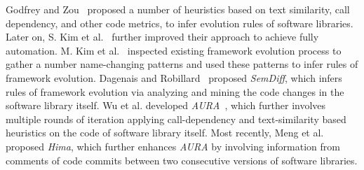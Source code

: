 Godfrey and Zou~\cite{Godfrey:TSE05} proposed a number of heuristics based on text similarity, call dependency, and other code metrics, to infer evolution rules of software libraries. Later on, S. Kim et al.~\cite{Kim:WCRE05} further improved their approach to achieve fully automation. M. Kim et al.~\cite{Kim:ICSE07} inspected existing framework evolution process to gather a number name-changing patterns and used these patterns to infer rules of framework evolution. Dagenais and Robillard~\cite{Dagenais:ICSE08} proposed \emph{SemDiff}, which infers rules of framework evolution via analyzing and mining the code changes in the software library itself. Wu et al. developed \emph{AURA}~\cite{Wu:ICSE10}, which further involves multiple rounds of iteration applying call-dependency and text-similarity based heuristics on the code of software library itself. Most recently, Meng et al.~\cite{MengHima} proposed \emph{Hima}, which further enhances \emph{AURA} by involving information from comments of code commits between two consecutive versions of software libraries. 




